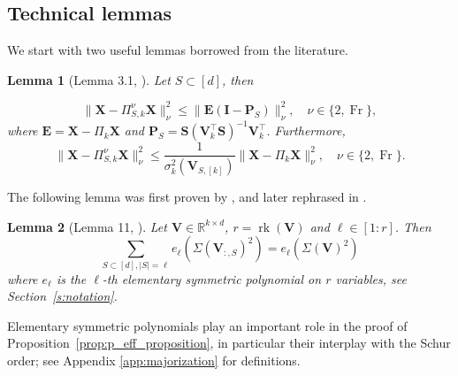 \documentclass[twoside,11pt]{book}
\newtheorem{lemma}{Lemma}
\newtheorem{example}{Example}
\numberwithin{theorem}{chapter}
\numberwithin{definition}{chapter}
\numberwithin{proposition}{chapter}
\numberwithin{corollary}{chapter}
\numberwithin{example}{chapter}
\numberwithin{lemma}{chapter}
\numberwithin{assumption}{chapter}
\numberwithin{equation}{chapter}
\numberwithin{figure}{chapter}
\DeclareMathOperator{\Tr}{Tr}
\DeclareMathOperator{\rank}{\mathrm{rk}}
\DeclareMathOperator{\Det}{Det}
\DeclareMathOperator{\Fr}{\mathrm{Fr}}
\DeclareMathOperator{\Tran}{\intercal}
\begin{document}
\subsection{Technical lemmas}
We start with two useful lemmas borrowed from the literature.
\begin{lemma}[Lemma 3.1, \citealp{BoDrMI11}]\label{refined_analysis_of_approximation_bound}
Let $S \subset [d]$, then

\begin{equation}
\| \bm{X} - \Pi_{S,k}^{\nu} \bm{X} \|_{\nu}^{2}  \leq  \| \bm{E}(\bm{I}-\bm{P}_{S})\|_{\nu}^{2}, \quad \nu \in \{2,\Fr\},
\end{equation}
where   $\bm{E} = \bm{X} - \Pi_{k}\bm{X}$ and $\bm{P}_{S} = \bm{S}(\bm{V}_{k}^{\Tran}\bm{S})^{-1}\bm{V}_{k}^{\Tran}$.
Furthermore,
\begin{equation}
\| \bm{X} - \Pi_{S,k}^{\nu} \bm{X} \|_{\nu}^{2} \leq  \frac{1}{\sigma_{k}^{2}(\bm{V}_{S,[k]})} \| \bm{X} - \Pi_{k}\bm{X}\|_{\nu}^{2} , \quad \nu \in \{2,\Fr\}.
\end{equation}
\end{lemma}
The following lemma was first proven by \citealp{DRVW06}, and later rephrased in \cite{DeRa10}.
\begin{lemma}[Lemma 11, \citealp{DeRa10}]\label{minors_symmetric_polynomials_lemma}
Let $\bm{V} \in \mathbb{R}^{k \times d}$, $r = \rank(\bm{V})$ and $\ell \in [1:r]$. Then
\begin{equation}
\sum\limits_{S \subset [d], |S| = \ell} e_{\ell}(\Sigma(\bm{V}_{:,S})^{2}) = e_{\ell}(\Sigma(\bm{V})^{2})
\end{equation}
where $e_{\ell}$ is the $\ell$-th elementary symmetric polynomial on $r$ variables, see Section~\ref{s:notation}.
\end{lemma}
Elementary symmetric polynomials play an important role in the proof of Proposition~\ref{prop:p_eff_proposition}, in particular their interplay with the Schur order; see Appendix \ref{app:majorization} for definitions.
\end{document}
